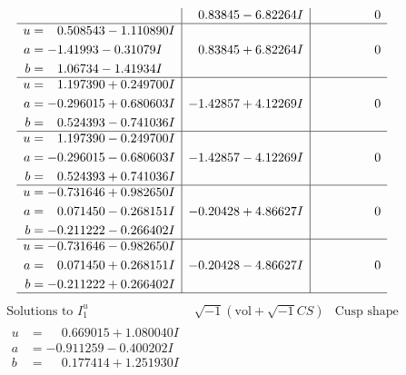 \documentclass[1p]{elsarticle_modified}
\theoremstyle{definition}
\newcommand{\I}{\sqrt{-1}}
\begin{document}
$$\begin{array}{c|c|c}
 & \phantom{-}0.83845 - 6.82264 I & \phantom{-0.000000 } 0 \\ \hline\begin{aligned}
u &= \phantom{-}0.508543 - 1.110890 I \\
a &= -1.41993 - 0.31079 I \\
b &= \phantom{-}1.06734 - 1.41934 I\end{aligned}
 & \phantom{-}0.83845 + 6.82264 I & \phantom{-0.000000 } 0 \\ \hline\begin{aligned}
u &= \phantom{-}1.197390 + 0.249700 I \\
a &= -0.296015 + 0.680603 I \\
b &= \phantom{-}0.524393 - 0.741036 I\end{aligned}
 & -1.42857 + 4.12269 I & \phantom{-0.000000 } 0 \\ \hline\begin{aligned}
u &= \phantom{-}1.197390 - 0.249700 I \\
a &= -0.296015 - 0.680603 I \\
b &= \phantom{-}0.524393 + 0.741036 I\end{aligned}
 & -1.42857 - 4.12269 I & \phantom{-0.000000 } 0 \\ \hline\begin{aligned}
u &= -0.731646 + 0.982650 I \\
a &= \phantom{-}0.071450 - 0.268151 I \\
b &= -0.211222 - 0.266402 I\end{aligned}
 & -0.20428 + 4.86627 I & \phantom{-0.000000 } 0 \\ \hline\begin{aligned}
u &= -0.731646 - 0.982650 I \\
a &= \phantom{-}0.071450 + 0.268151 I \\
b &= -0.211222 + 0.266402 I\end{aligned}
 & -0.20428 - 4.86627 I & \phantom{-0.000000 } 0\\
 \hline 
 \end{array}$$\newpage$$\begin{array}{c|c|c}  
\text{Solutions to }I^u_{1}& \I (\text{vol} + \sqrt{-1}CS) & \text{Cusp shape}\\
 \hline 
\begin{aligned}
u &= \phantom{-}0.669015 + 1.080040 I \\
a &= -0.911259 - 0.400202 I \\
b &= \phantom{-}0.177414 + 1.251930 I\end{aligned}

\end{array}$$
\end{document}
